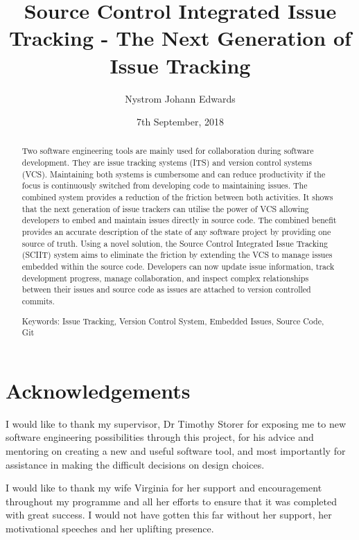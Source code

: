 \documentclass{mproj}
\begin{document}
\title{Source Control Integrated Issue Tracking - The Next Generation of Issue Tracking}
\author{Nystrom Johann Edwards}
\date{7th September, 2018}
\maketitle

\begin{abstract}
Two software engineering tools are mainly used for collaboration during software development. They are issue tracking systems (ITS) and version control systems (VCS). Maintaining both systems is cumbersome and can reduce productivity if the focus is continuously switched from developing code to maintaining issues. The combined system provides a reduction of the friction between both activities. It shows that the next generation of issue trackers can utilise the power of VCS allowing developers to embed and maintain issues directly in source code. The combined benefit provides an accurate description of the state of any software project by providing one source of truth. Using a novel solution, the Source Control Integrated Issue Tracking (SCIIT) system aims to eliminate the friction by extending the VCS to manage issues embedded within the source code. Developers can now update issue information, track development progress, manage collaboration, and inspect complex relationships between their issues and source code as issues are attached to version controlled commits.

Keywords: Issue Tracking, Version Control System, Embedded Issues, Source Code, Git
\end{abstract}

\educationalconsent
\newpage

\section*{Acknowledgements}

I would like to thank my supervisor, Dr Timothy Storer for exposing me to new software engineering possibilities through this project, for his advice and mentoring on creating a new and useful software tool, and most importantly for assistance in making the difficult decisions on design choices.

I would like to thank my wife Virginia for her support and encouragement throughout my programme and all her efforts to ensure that it was completed with great success. I would not have gotten this far without her support, her motivational speeches and her uplifting presence.
\end{document}
